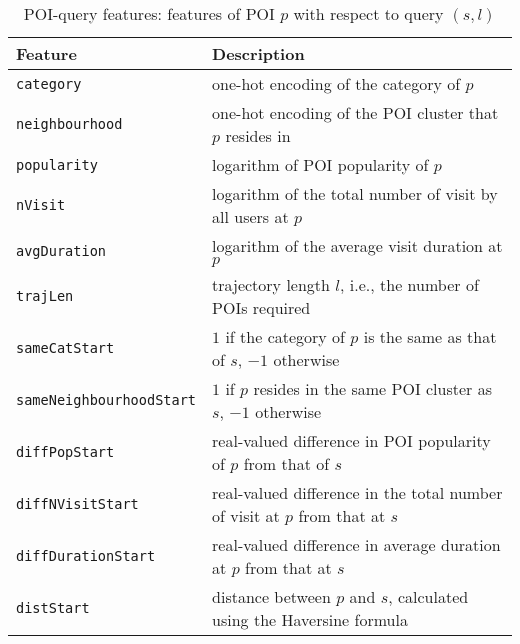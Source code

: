 \begin{table}[!h]
\caption{POI-query features: features of POI $p$ with respect to query $(s,l)$}
\label{tab:poifeature}
\centering
\small
\setlength{\tabcolsep}{10pt} %
\begin{tabular}{l|l} \hline
\textbf{Feature}       & \textbf{Description} \\ \hline
\texttt{category}      & one-hot encoding of the category of $p$ \\
\texttt{neighbourhood} & one-hot encoding of the POI cluster that $p$ resides in \\
\texttt{popularity}    & logarithm of POI popularity of $p$ \\
\texttt{nVisit}        & logarithm of the total number of visit by all users at $p$ \\
\texttt{avgDuration}  & logarithm of the average visit duration at $p$ \\
\hline

\texttt{trajLen}           & trajectory length $l$, i.e., the number of POIs required \\
\texttt{sameCatStart}      & $1$ if the category of $p$ is the same as that of $s$, $-1$ otherwise \\
\texttt{sameNeighbourhoodStart} & $1$ if $p$ resides in the same POI cluster as $s$, $-1$ otherwise \\
\texttt{diffPopStart}    & real-valued difference in POI popularity of $p$ from that of $s$ \\
\texttt{diffNVisitStart}        & real-valued difference in the total number of visit at $p$ from that at $s$ \\
\texttt{diffDurationStart}  & real-valued difference in average duration at $p$ from that at $s$ \\
\texttt{distStart}          & distance between $p$ and $s$, calculated using the Haversine formula \\
\hline
\end{tabular}
\end{table}



